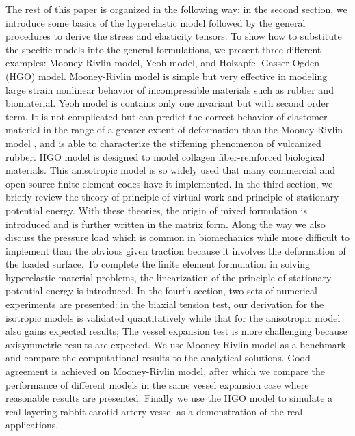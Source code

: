 The rest of this paper is organized in the following way: in the second section, we introduce some basics of the hyperelastic model followed by the general procedures to derive the stress and elasticity tensors. To show how to substitute the specific models into the general formulations, we present three different examples: Mooney-Rivlin model, Yeoh model, and Holzapfel-Gasser-Ogden (HGO) model. Mooney-Rivlin model is simple but very effective in modeling large strain nonlinear behavior of incompressible materials such as rubber and biomaterial. Yeoh model is contains only one invariant but with second order term. It is not complicated but can predict the correct behavior of elastomer material in the range of a greater extent of deformation than the Mooney-Rivlin model \cite{Gajewski}, and is able to characterize the stiffening phenomenon of vulcanized rubber. HGO model is designed to model collagen fiber-reinforced biological materials. This anisotropic model is so widely used that many commercial and open-source finite element codes have it implemented. In the third section, we briefly review the theory of principle of virtual work and principle of stationary potential energy. With these theories, the origin of mixed formulation is introduced and is further written in the matrix form. Along the way we also discuss the pressure load which is common in biomechanics while more difficult to implement than the obvious given traction because it involves the deformation of the loaded surface. To complete the finite element formulation in solving hyperelastic material problems, the linearization of the principle of stationary potential energy is introduced. In the fourth section, two sets of numerical experiments are presented: in the biaxial tension test, our derivation for the isotropic models is validated quantitatively while that for the anisotropic model also gains expected results; The vessel expansion test is more challenging because axisymmetric results are expected. We use Mooney-Rivlin model as a benchmark and compare the computational results to the analytical solutions. Good agreement is achieved on Mooney-Rivlin model, after which we compare the performance of different models in the same vessel expansion case where reasonable results are presented. Finally we use the HGO model to simulate a real layering rabbit carotid artery vessel as a demonstration of the real applications. 




 



